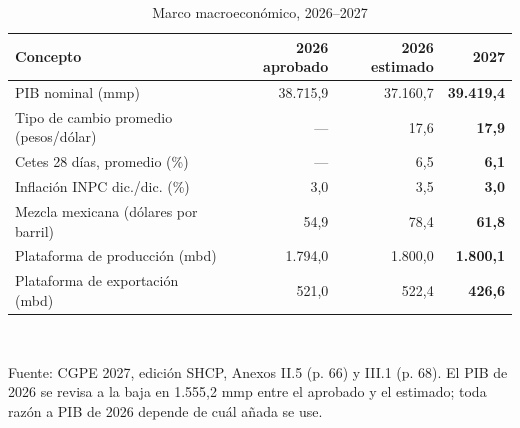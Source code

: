 \begin{table}[htbp]\centering\small
\caption{Marco macroeconómico, 2026--2027}\label{cua:macro}
\begin{tabular}{lrrr}
\toprule
Concepto & 2026 aprobado & 2026 estimado & \textbf{2027} \\
\midrule
PIB nominal (mmp) & 38.715,9 & 37.160,7 & \textbf{39.419,4} \\
Tipo de cambio promedio (pesos/dólar) & --- & 17,6 & \textbf{17,9} \\
Cetes 28 días, promedio (\%) & --- & 6,5 & \textbf{6,1} \\
Inflación INPC dic./dic. (\%) & 3,0 & 3,5 & \textbf{3,0} \\
Mezcla mexicana (dólares por barril) & 54,9 & 78,4 & \textbf{61,8} \\
Plataforma de producción (mbd) & 1.794,0 & 1.800,0 & \textbf{1.800,1} \\
Plataforma de exportación (mbd) & 521,0 & 522,4 & \textbf{426,6} \\
\bottomrule
\end{tabular}
\\[2pt]\begin{minipage}{0.92\textwidth}\scriptsize Fuente: CGPE 2027, edición SHCP, Anexos II.5 (p. 66) y III.1 (p. 68). El PIB de 2026 se revisa a la baja en 1.555,2 mmp entre el aprobado y el estimado; toda razón a PIB de 2026 depende de cuál añada se use.\end{minipage}
\end{table}
